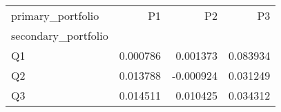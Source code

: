 \begin{tabular}{lrrr}
\toprule
primary_portfolio & P1 & P2 & P3 \\
secondary_portfolio &  &  &  \\
\midrule
Q1 & 0.000786 & 0.001373 & 0.083934 \\
Q2 & 0.013788 & -0.000924 & 0.031249 \\
Q3 & 0.014511 & 0.010425 & 0.034312 \\
\bottomrule
\end{tabular}
